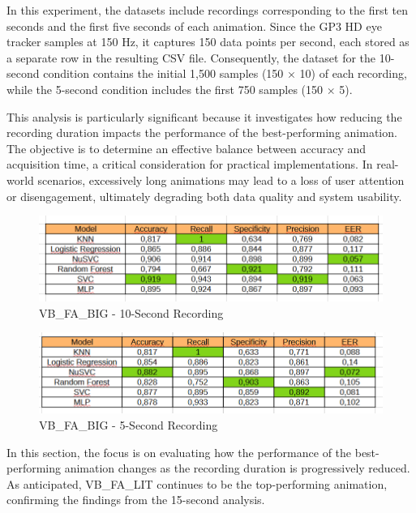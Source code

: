 \documentclass{article}
\begin{document}
In this experiment, the datasets include recordings corresponding to the first ten seconds and the first five seconds of each animation. 
Since the GP3 HD eye tracker samples at 150 Hz, it captures 150 data points per second, each stored as a separate row in the resulting CSV file. 
Consequently, the dataset for the 10-second condition contains the initial 1,500 samples (150 × 10) of each recording, while the 5-second condition includes the first 750 samples (150 × 5).

This analysis is particularly significant because it investigates how reducing the recording duration impacts the performance of the best-performing animation. 
The objective is to determine an effective balance between accuracy and acquisition time, a critical consideration for practical implementations. 
In real-world scenarios, excessively long animations may lead to a loss of user attention or disengagement, ultimately degrading both data quality and system usability.

\begin{figure}[ht]
    \centering
    \includegraphics[width = 0.8
    \textwidth]{Images/Results/Verification_single_five_ten/ft/ten/VB_FA_LIT.png}
    \caption{VB\_FA\_BIG - 10-Second Recording}
    \label{fig:VB_FA_LIT_10_ft}
\end{figure}

\begin{figure}[ht]
    \centering
    \includegraphics[width = 0.8
    \textwidth]{Images/Results/Verification_single_five_ten/ft/five/VB_FA_LIT.png}
    \caption{VB\_FA\_BIG - 5-Second Recording}
    \label{fig:VB_FA_LIT_5_ft}
\end{figure}

In this section, the focus is on evaluating how the performance of the best-performing animation changes as the recording duration is progressively reduced. 
As anticipated, VB\_FA\_LIT continues to be the top-performing animation, confirming the findings from the 15-second analysis.
\end{document}
